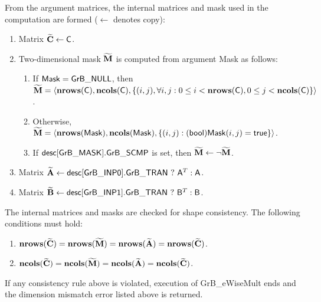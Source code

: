 From the argument matrices, the internal matrices and mask used in the computation are formed ($\leftarrow$ denotes copy):
\begin{enumerate}
	\item Matrix ${\bf \widetilde{C}} \leftarrow {\sf C}$.

	\item Two-dimensional mask ${\bf \widetilde{M}}$ is computed from argument {\sf Mask} as follows:
	\begin{enumerate}

		\item	If ${\sf Mask} = {\sf GrB\_NULL}$, then ${\bf \widetilde{M}} = \langle \bold{nrows}({\sf C}), \bold{ncols}({\sf C}), \{(i,j), \forall i,j : 0 \leq i <  \bold{nrows}({\sf C}), 0 \leq j < \bold{ncols}({\sf C}) \} \rangle$.

		\item	Otherwise, ${\bf \widetilde{M}} = \langle \bold{nrows}({\sf Mask}), \bold{ncols}({\sf Mask}), \{(i,j) : ({\sf bool}){\sf Mask}(i,j) = {\sf true}\} \rangle$.

		\item	If ${\sf desc[GrB\_MASK].GrB\_SCMP}$ is set, then ${\bf \widetilde{M}} \leftarrow \neg {\bf \widetilde{M}}$.

	\end{enumerate}

	\item Matrix ${\bf \widetilde{A}} \leftarrow {\sf desc[GrB\_INP0].GrB\_TRAN} \ ? \ {\sf A}^T : {\sf A}$.

	\item Matrix ${\bf \widetilde{B}} \leftarrow {\sf desc[GrB\_INP1].GrB\_TRAN} \ ? \ {\sf B}^T : {\sf B}$.
\end{enumerate}

The internal matrices and masks are checked for shape consistency. The following conditions must hold:
\begin{enumerate}	
	\item $\bold{nrows}({\bf \widetilde{C}}) = \bold{nrows}({\bf \widetilde{M}})
	     = \bold{nrows}({\bf \widetilde{A}}) = \bold{nrows}({\bf \widetilde{C}})$.

	\item $\bold{ncols}({\bf \widetilde{C}}) = \bold{ncols}({\bf \widetilde{M}})
	     = \bold{ncols}({\bf \widetilde{A}}) = \bold{ncols}({\bf \widetilde{C}})$.
\end{enumerate}
If any consistency rule above is violated, execution of {\sf GrB\_eWiseMult} ends and the dimension mismatch error listed above is returned.

